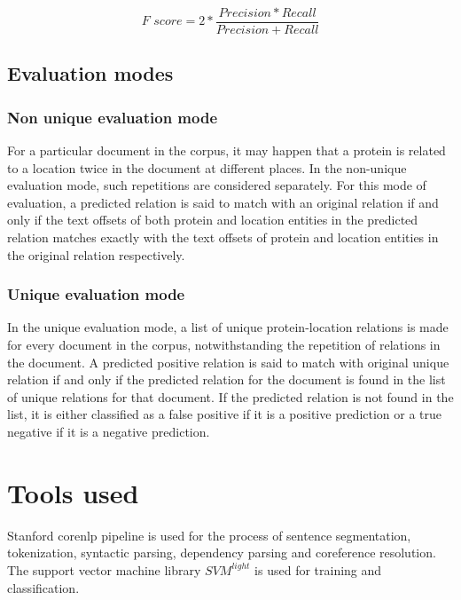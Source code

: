 $$
\textit{F score} = 2 * \frac{Precision * Recall}{Precision + Recall}
$$



\subsection{Evaluation modes} \label{subsec:Eval}


\subsubsection{Non unique evaluation mode}\label{subsubsec:NonUniqEval}

For a particular document in the corpus, it may happen that a protein is related to a location twice in the document at different places. In the non-unique evaluation mode, such repetitions are considered separately. For this mode of evaluation, a predicted relation is said to match with an original relation if and only if the text offsets of both protein and location entities in the predicted relation matches exactly with the text offsets of protein and location entities in the original relation respectively.

\subsubsection{Unique evaluation mode}\label{subsubsec:UniqEval}

In the unique evaluation mode, a list of unique protein-location relations is made for every document in the corpus, notwithstanding the repetition of relations in the document. A predicted positive relation is said to match with original unique relation if and only if the predicted relation for the document is found in the list of unique relations for that document. If the predicted relation is not found in the list, it is either classified as a false positive if it is a positive prediction or a true negative if it is a negative prediction.

\section{Tools used}\label{sec:tools}

Stanford corenlp pipeline \cite{manning2014stanford} is used for the process of sentence segmentation, tokenization, syntactic parsing, dependency parsing and coreference resolution. The support vector machine library $SVM^{light}$ \cite{joachims1999making} is used for training and classification.
